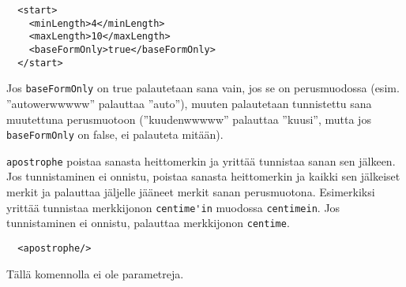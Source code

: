 \documentclass[12pt]{article}
\begin{document}
\begin{verbatim}
  <start>
    <minLength>4</minLength>
    <maxLength>10</maxLength>
    <baseFormOnly>true</baseFormOnly>
  </start>
\end{verbatim}

Jos \verb=baseFormOnly= on true palautetaan sana vain, jos se on
perusmuodossa (esim. ''autowerwwwww'' palauttaa ''auto''), muuten
palautetaan tunnistettu sana muutettuna perusmuotoon (''kuudenwwwww''
palauttaa ''kuusi'', mutta jos \verb=baseFormOnly= on false, ei
palauteta mitään).




\bigskip

\verb=apostrophe= poistaa sanasta heittomerkin ja yrittää tunnistaa
sanan sen jälkeen. Jos tunnistaminen ei onnistu, poistaa sanasta
heittomerkin ja kaikki sen jälkeiset merkit ja palauttaa jäljelle
jääneet merkit sanan perusmuotona. Esimerkiksi yrittää tunnistaa
merkkijonon \verb=centime'in= muodossa \verb=centimein=. Jos
tunnistaminen ei onnistu, palauttaa merkkijonon \verb=centime=.


\begin{verbatim}
  <apostrophe/>
\end{verbatim}

Tällä komennolla ei ole parametreja.
\end{document}
